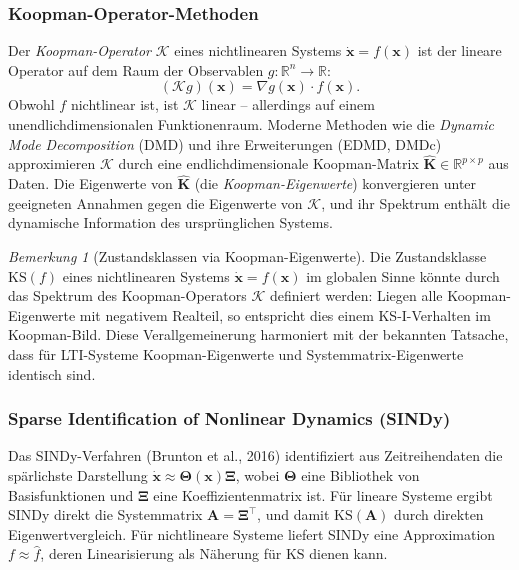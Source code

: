 ﻿\documentclass[12pt, a4paper, titlepage]{report}
\theoremstyle{definition}
\theoremstyle{remark}
\newtheorem{remark}[theorem]{Bemerkung}
\newcommand{\R}{\mathbb{R}}
\newcommand{\vx}{\bm{x}}
\newcommand{\vA}{\bm{A}}
\newcommand{\vK}{\bm{K}}
\newcommand{\T}{\top}
\newcommand{\KS}{\mathrm{KS}}
\begin{document}
\subsubsection*{Koopman-Operator-Methoden}

Der \emph{Koopman-Operator} $\mathcal{K}$ eines nichtlinearen Systems
$\dot{\vx} = f(\vx)$ ist der lineare Operator auf dem Raum der Observablen
$g : \R^n \to \R$:
\begin{equation}
  (\mathcal{K} g)(\vx) = \nabla g(\vx) \cdot f(\vx).
  \label{eq:koopman}
\end{equation}
Obwohl $f$ nichtlinear ist, ist $\mathcal{K}$ linear -- allerdings auf einem
unendlichdimensionalen Funktionenraum. Moderne Methoden wie die \emph{Dynamic Mode
Decomposition} (DMD) und ihre Erweiterungen (EDMD, DMDc) approximieren $\mathcal{K}$
durch eine endlichdimensionale Koopman-Matrix $\hat{\vK} \in \R^{p \times p}$
aus Daten. Die Eigenwerte von $\hat{\vK}$ (die \emph{Koopman-Eigenwerte}) konvergieren
unter geeigneten Annahmen gegen die Eigenwerte von $\mathcal{K}$, und ihr Spektrum
enthält die dynamische Information des ursprünglichen Systems.

\begin{remark}[Zustandsklassen via Koopman-Eigenwerte]
Die Zustandsklasse $\KS(f)$ eines nichtlinearen Systems $\dot{\vx} = f(\vx)$ im globalen
Sinne könnte durch das Spektrum des Koopman-Operators $\mathcal{K}$ definiert werden:
Liegen alle Koopman-Eigenwerte mit negativem Realteil, so entspricht dies einem
KS-I-Verhalten im Koopman-Bild. Diese Verallgemeinerung harmoniert mit der
bekannten Tatsache, dass für LTI-Systeme Koopman-Eigenwerte und Systemmatrix-Eigenwerte
identisch sind.
\end{remark}

\subsubsection*{Sparse Identification of Nonlinear Dynamics (SINDy)}

Das SINDy-Verfahren (Brunton et al., 2016) identifiziert aus Zeitreihendaten die
spärlichste Darstellung $\dot{\vx} \approx \bm{\Theta}(\vx)\bm{\Xi}$, wobei
$\bm{\Theta}$ eine Bibliothek von Basisfunktionen und $\bm{\Xi}$ eine Koeffizientenmatrix
ist. Für lineare Systeme ergibt SINDy direkt die Systemmatrix $\vA = \bm{\Xi}^\T$,
und damit $\KS(\vA)$ durch direkten Eigenwertvergleich. Für nichtlineare Systeme
liefert SINDy eine Approximation $f \approx \hat{f}$, deren Linearisierung als
Näherung für $\KS$ dienen kann.
\end{document}
